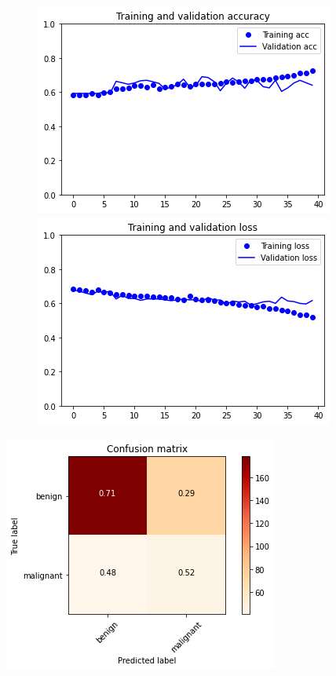 \documentclass{article}
\begin{document}
\begin{figure}[h]
    \centering
    \begin{minipage}{0.45\textwidth}
        \centering
        \includegraphics[scale=0.46]{./img/scratchVal4_2.png}
    \end{minipage}\hfill
    \begin{minipage}{0.45\textwidth}
        \centering
        \includegraphics[scale=0.46]{./img/scratchLoss4_2.png}
    \end{minipage}
\end{figure}

\begin{center}
\begin{minipage}{0.45\textwidth}
        \includegraphics[scale=0.6]{./img/cmScratch4_2.png}
    \end{minipage}
\end{center}
\end{document}
